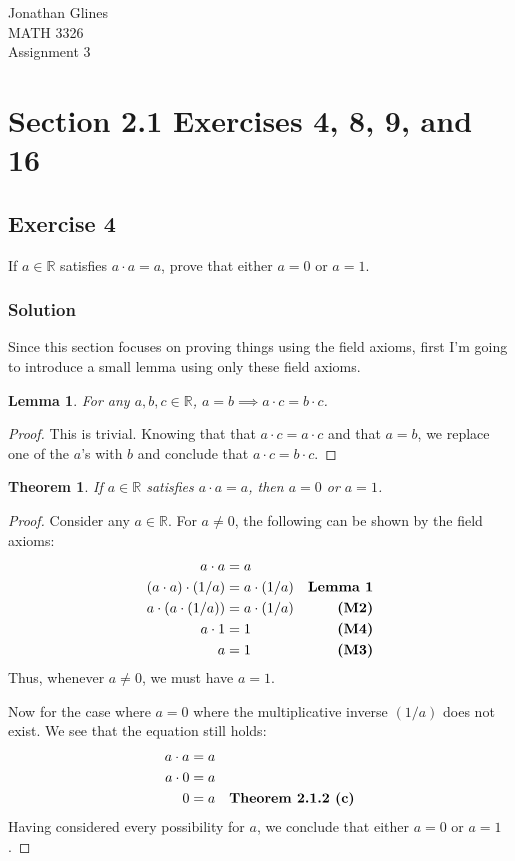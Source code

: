 \documentclass[12pt]{article}
\newtheorem*{thm}{Theorem}
\newtheorem{lem}{Lemma}
\begin{document}
\begin{flushright}
{\Large
Jonathan Glines \\
MATH 3326 \\
Assignment 3 \\
}
\end{flushright}
\section*{Section 2.1 Exercises 4, 8, 9, and 16}
\subsection*{Exercise 4}
If $a \in \mathbb{R}$ satisfies $a \cdot a = a$, prove that either $a = 0$ or $a = 1$.
\subsubsection*{Solution}
Since this section focuses on proving things using the field axioms, first I'm going to introduce a small lemma using only these field axioms.
\begin{lem}
For any $a, b, c \in \mathbb{R}$, $a = b \implies a \cdot c = b \cdot c$.
\end{lem}
\begin{proof}
This is trivial. Knowing that that $a \cdot c = a \cdot c$ and that $a = b$, we replace one of the $a$'s with $b$ and conclude that $a \cdot c = b \cdot c$.
\end{proof}

\begin{thm}
If $a \in \mathbb{R}$ satisfies $a \cdot a = a$, then $a = 0$ or $a = 1$.
\end{thm}
\begin{proof}
Consider any $a \in \mathbb{R}$. For $a \neq 0$, the following can be shown by the field axioms:
\begin{align*}
a \cdot a &= a \\
\left(a \cdot a\right) \cdot \left(1/a\right) &= a \cdot \left(1 / a\right) & \text{\bf Lemma 1}\\
a \cdot \left(a \cdot \left(1/a\right)\right) &= a \cdot \left(1/a\right) & \text{\bf (M2)} \\
a \cdot 1 &= 1 & \text{\bf (M4)}\\
a &= 1 & \text{\bf (M3)}
\end{align*}
Thus, whenever $a \neq 0$, we must have $a = 1$.

Now for the case where $a = 0$ where the multiplicative inverse $\left(1/a\right)$ does not exist. We see that the equation still holds:
\begin{align*}
a \cdot a &= a \\
a \cdot 0 &= a \\
0 &= a & \text{\bf Theorem 2.1.2 (c)}
\end{align*}
Having considered every possibility for $a$, we conclude that either $a = 0$ or $a = 1$.
\end{proof}
\end{document}
